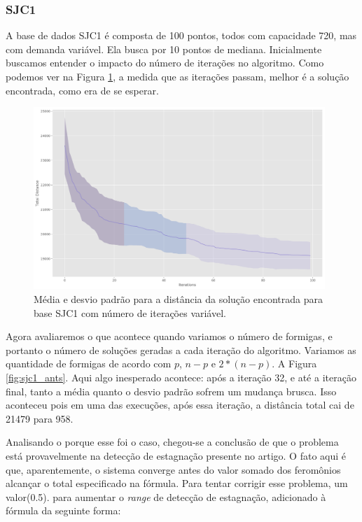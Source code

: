 \subsubsection{SJC1}

A base de dados SJC1 é composta de 100 pontos, todos com capacidade 720, mas com demanda variável. Ela busca por 10 pontos de mediana. Inicialmente buscamos entender o impacto do número de iterações no algoritmo. Como podemos ver na Figura \ref{fig:sjc1_iterations}, a medida que as iterações passam, melhor é a solução encontrada, como era de se esperar. 

\begin{figure}[h]	
  \centering
  \includegraphics[width=11cm,keepaspectratio]{images/SJC1_iterations.png}
  \caption{Média e desvio padrão para a distância da solução encontrada para base SJC1 com número de iterações variável.}
  \label{fig:sjc1_iterations}
\end{figure}

Agora avaliaremos o que acontece quando variamos o número de formigas, e portanto o número de soluções geradas a cada iteração do algoritmo. Variamos as quantidade de formigas de acordo com $p$, $n - p$ e $2 * (n - p)$. A Figura \ref{fig:sjc1_ants}. Aqui algo inesperado acontece: após a iteração 32, e até a iteração final, tanto a média quanto o desvio padrão sofrem um mudança brusca. Isso aconteceu pois em uma das execuções, após essa iteração, a distância total cai de 21479 para 958. 

Analisando o porque esse foi o caso, chegou-se a conclusão de que o problema está provavelmente na detecção de estagnação presente no artigo. O fato aqui é que, aparentemente, o sistema converge antes do valor somado dos feromônios alcançar o total especificado na fórmula. Para tentar corrigir esse problema, um valor(0.5). para aumentar o \textit{range} de detecção de estagnação, adicionado à fórmula da seguinte forma:

